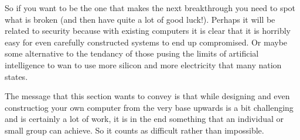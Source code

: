 So if you want to be the one that makes the next breakthrough you need
to spot what is broken (and then have quite a lot of good luck!). Perhaps
it will be related to security because with existing computers it is
clear that it is horribly easy for even carefully constructed systems to
end up compromised. Or maybe some alternative to the tendancy of those
pusing the limits of artificial intelligence to wan to use more
silicon and more electricity that many nation states.

The message that this section wants to convey is that while designing and
even constructiog your own computer from the very base upwards is a bit
challenging and is certainly a lot of work, it is in the end something that
an individual or small group can achieve. So it counts as difficult
rather than impossible.

